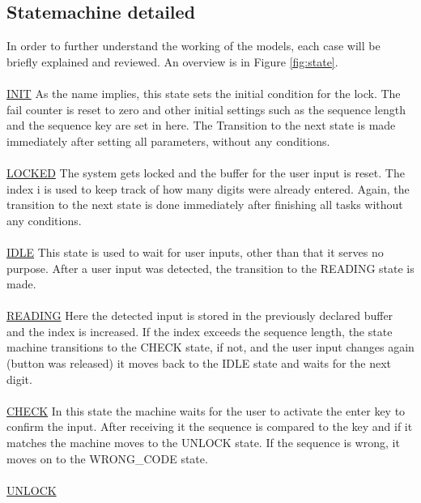 		\subsection{Statemachine detailed}
		In order to further understand the working of the models, each case will be briefly explained and reviewed. An overview is in Figure \ref{fig:state}.
		\\~\\
		\underline{INIT} \newline
		As the name implies, this state sets the initial condition for the lock. The fail counter is reset to zero and other initial settings such as the sequence length and the sequence key are set in here. The Transition to the next state is made immediately after setting all parameters, without any conditions.
		\\~\\
		\underline{LOCKED} \newline
		The system gets locked and the buffer for the user input is reset. The index i is used to keep track of how many digits were already entered. Again, the transition to the next state is done immediately after finishing all tasks without any conditions.
		\\~\\
		\underline{IDLE} \newline
		This state is used to wait for user inputs, other than that it serves no purpose. After a user input was detected, the transition to the READING state is made.
		\\~\\
		\underline{READING} \newline
		Here the detected input is stored in the previously declared buffer and the index is increased. If the index exceeds the sequence length, the state machine transitions to the CHECK state, if not, and the user input changes again (button was released) it moves back to the IDLE state and waits for the next digit.
		\\~\\
		\underline{CHECK} \newline
		In this state the machine waits for the user to activate the enter key to confirm the input. After receiving it the sequence is compared to the key and if it matches the machine moves to the UNLOCK state. If the sequence is wrong, it moves on to the WRONG\_CODE state.
		\\~\\
		\underline{UNLOCK} \newline
